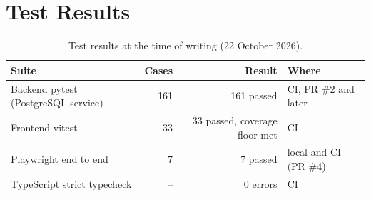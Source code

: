 \section{Test Results}
\begin{table}[H]
\centering\small
\begin{tabular}{lrrl}
\toprule
Suite & Cases & Result & Where\\
\midrule
Backend pytest (PostgreSQL service) & 161 & 161 passed & CI, PR \#2 and later\\
Frontend vitest & 33 & 33 passed, coverage floor met & CI\\
Playwright end to end & 7 & 7 passed & local and CI (PR \#4)\\
TypeScript strict typecheck & -- & 0 errors & CI\\
\bottomrule
\end{tabular}
\caption{Test results at the time of writing (22 October 2026).}
\end{table}

